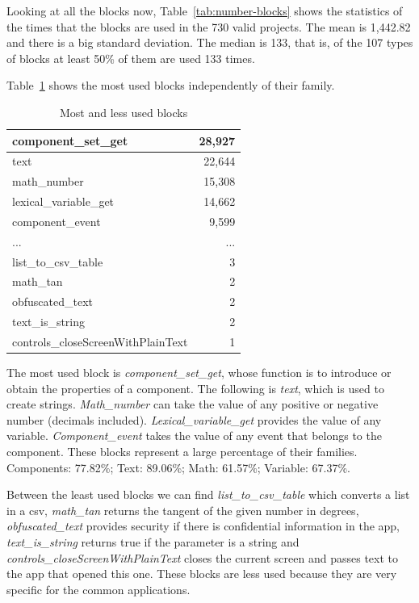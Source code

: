 \documentclass[a4paper]{article}
\begin{document}
Looking at all the blocks now, Table~\ref{tab:number-blocks} shows the statistics of the times that the blocks are used in the 730 valid projects. The mean is 1,442.82 and there is a big standard deviation. The median is 133, that is, of the 107 types of blocks at least 50\% of them are used 133 times.

Table~\ref{tab:most-least} shows the most used blocks independently of their family.

\begin{table}
\begin{center}
\caption{Most and less used blocks}
\bigskip
\label{tab:most-least}
\begin{tabular}{|l|r|}
\hline
component\_set\_get & 28,927\\ \hline
text & 22,644\\ \hline
math\_number & 15,308\\ \hline
lexical\_variable\_get & 14,662\\ \hline
component\_event & 9,599\\ \hline
... & ... \\ \hline
list\_to\_csv\_table & 3\\ \hline
math\_tan & 2\\ \hline
obfuscated\_text & 2\\ \hline
text\_is\_string & 2\\ \hline
controls\_closeScreenWithPlainText & 1\\ \hline
\end{tabular}
\end{center}
\end{table}

The most used block is \emph{component\_set\_get}, whose function is to introduce or obtain the properties of a component. The following is \emph{text}, which is used to create strings. \emph{Math\_number} can take the value of any positive or negative number (decimals included). \emph{Lexical\_variable\_get} provides the value of any variable. \emph{Component\_event} takes the value of any event that belongs to the component.
These blocks represent a large percentage of their families. Components: 77.82\%; Text: 89.06\%; Math: 61.57\%; Variable: 67.37\%.

Between the least used blocks we can find \emph{list\_to\_csv\_table} which converts a list in a csv, \emph{math\_tan} returns the tangent of the given number in degrees, \emph{obfuscated\_text} provides security if there is confidential information in the app, \emph{text\_is\_string} returns true if the parameter is a string and \emph{controls\_closeScreenWithPlainText} closes the current screen and passes text to the app that opened this one. These blocks are less used because they are very specific for the common applications.
\end{document}
